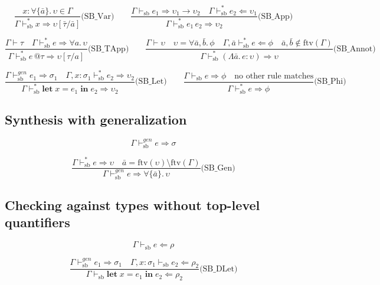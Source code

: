 \documentclass{article}
\begin{document}
\[
\frac{x\!:\!\forall\{\bar{a}\}.\, \upsilon \in \Gamma}{\Gamma \vdash_{\mathrm{sb}}^{*} x \Rightarrow \upsilon[\bar{\tau}/\bar{a}]}\text{(SB\_Var)}
\qquad
\frac{\Gamma \vdash_{\mathrm{sb}} e_1 \Rightarrow \upsilon_1 \to \upsilon_2 \quad \Gamma \vdash_{\mathrm{sb}}^{*} e_2 \Leftarrow \upsilon_1}{\Gamma \vdash_{\mathrm{sb}}^{*} e_1\, e_2 \Rightarrow \upsilon_2}\text{(SB\_App)}
\]

\[
\frac{\Gamma \vdash \tau \quad \Gamma \vdash_{\mathrm{sb}}^{*} e \Rightarrow \forall a.\, \upsilon}{\Gamma \vdash_{\mathrm{sb}}^{*} e\, @\tau \Rightarrow \upsilon[\tau/a]}\text{(SB\_TApp)}
\qquad
\frac{\Gamma \vdash \upsilon \quad \upsilon = \forall \bar{a}, \bar{b}.\, \phi \quad \Gamma, \bar{a} \vdash_{\mathrm{sb}}^{*} e \Leftarrow \phi \quad \bar{a}, \bar{b} \notin \mathrm{ftv}(\Gamma)}{\Gamma \vdash_{\mathrm{sb}}^{*} (\Lambda \bar{a}.\, e : \upsilon) \Rightarrow \upsilon}\text{(SB\_Annot)}
\]

\[
\frac{\Gamma \vdash_{\mathrm{sb}}^{\mathit{gen}} e_1 \Rightarrow \sigma_1 \quad \Gamma, x\!:\!\sigma_1 \vdash_{\mathrm{sb}}^{*} e_2 \Rightarrow \upsilon_2}{\Gamma \vdash_{\mathrm{sb}}^{*} \mathbf{let}\; x = e_1 \;\mathbf{in}\; e_2 \Rightarrow \upsilon_2}\text{(SB\_Let)}
\qquad
\frac{\Gamma \vdash_{\mathrm{sb}} e \Rightarrow \phi \quad \text{no other rule matches}}{\Gamma \vdash_{\mathrm{sb}}^{*} e \Rightarrow \phi}\text{(SB\_Phi)}
\]

\subsection*{Synthesis with generalization}

\[
\boxed{\Gamma \vdash_{\mathrm{sb}}^{\mathit{gen}} e \Rightarrow \sigma}
\]

\[
\frac{\Gamma \vdash_{\mathrm{sb}}^{*} e \Rightarrow \upsilon \quad \bar{a} = \mathrm{ftv}(\upsilon) \setminus \mathrm{ftv}(\Gamma)}{\Gamma \vdash_{\mathrm{sb}}^{\mathit{gen}} e \Rightarrow \forall\{\bar{a}\}.\, \upsilon}\text{(SB\_Gen)}
\]

\subsection*{Checking against types without top-level quantifiers}

\[
\boxed{\Gamma \vdash_{\mathrm{sb}} e \Leftarrow \rho}
\]

\[
\frac{\Gamma \vdash_{\mathrm{sb}}^{\mathit{gen}} e_1 \Rightarrow \sigma_1 \quad \Gamma, x\!:\!\sigma_1 \vdash_{\mathrm{sb}} e_2 \Leftarrow \rho_2}{\Gamma \vdash_{\mathrm{sb}} \mathbf{let}\; x = e_1 \;\mathbf{in}\; e_2 \Leftarrow \rho_2}\text{(SB\_DLet)}
\]
\end{document}
